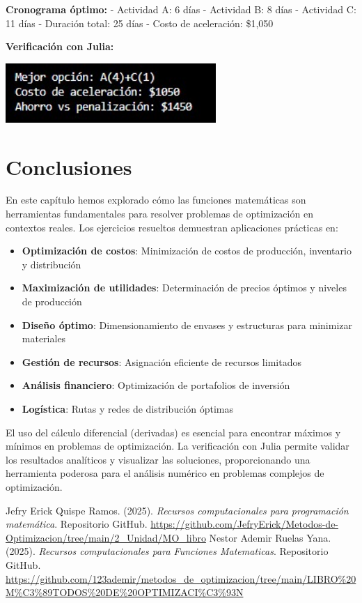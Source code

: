 \documentclass[12pt, a4paper, oneside]{book}
\theoremstyle{definition}
\begin{document}
\textbf{Cronograma óptimo:}
- Actividad A: 6 días
- Actividad B: 8 días  
- Actividad C: 11 días
- Duración total: 25 días
- Costo de aceleración: \$1,050

\textbf{Verificación con Julia:}


\begin{center}
\includegraphics[width=0.6\textwidth]{ejercicio10fm.png}
\end{center}

\section{Conclusiones}

En este capítulo hemos explorado cómo las funciones matemáticas son herramientas fundamentales para resolver problemas de optimización en contextos reales. Los ejercicios resueltos demuestran aplicaciones prácticas en:

\begin{itemize}
    \item \textbf{Optimización de costos}: Minimización de costos de producción, inventario y distribución
    \item \textbf{Maximización de utilidades}: Determinación de precios óptimos y niveles de producción
    \item \textbf{Diseño óptimo}: Dimensionamiento de envases y estructuras para minimizar materiales
    \item \textbf{Gestión de recursos}: Asignación eficiente de recursos limitados
    \item \textbf{Análisis financiero}: Optimización de portafolios de inversión
    \item \textbf{Logística}: Rutas y redes de distribución óptimas
\end{itemize}

El uso del cálculo diferencial (derivadas) es esencial para encontrar máximos y mínimos en problemas de optimización. La verificación con Julia permite validar los resultados analíticos y visualizar las soluciones, proporcionando una herramienta poderosa para el análisis numérico en problemas complejos de optimización.


    \begin{thebibliography}{99}
    Jefry Erick Quispe Ramos. (2025). 
    \textit{Recursos computacionales para programación matemática}. 
    Repositorio GitHub. 
    \url{https://github.com/JefryErick/Metodos-de-Optimizacion/tree/main/2_Unidad/MO_libro} 
    Nestor Ademir Ruelas Yana. (2025). 
    \textit{Recursos computacionales para Funciones Matematicas}. 
    Repositorio GitHub. 
    \url{https://github.com/123ademir/metodos_de_optimizacion/tree/main/LIBRO%20M%C3%89TODOS%20DE%20OPTIMIZACI%C3%93N} 
    \end{thebibliography}
    
\end{document}
